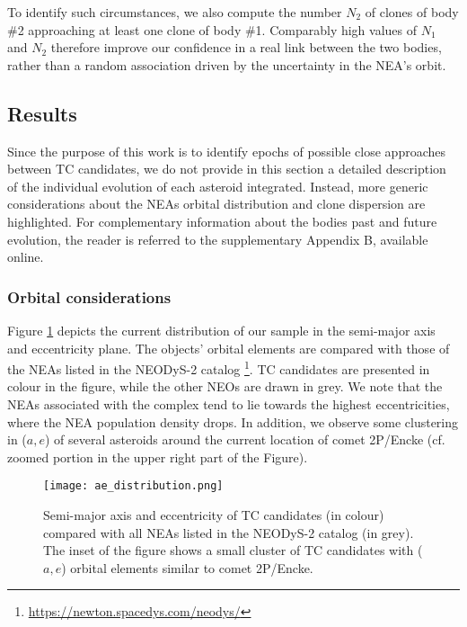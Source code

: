 \documentclass[letters,a4paper,fleqn,usenatbib]{mnras}
\begin{document}
To identify such circumstances, we also compute the number $N_2$ of clones of body \#2 approaching at least one clone of body \#1.  Comparably high values of $N_1$ and $N_2$ therefore improve our confidence in a real link between the two bodies, rather than a random association driven by the uncertainty in the NEA's orbit.

\subsection{Results}

Since the purpose of this work is to identify epochs of possible close approaches between TC candidates, we do not provide in this section a detailed description of the individual evolution of each asteroid integrated. Instead, more generic considerations about the NEAs orbital distribution and clone dispersion are highlighted. For complementary information about the bodies past and future evolution, the reader is referred to the supplementary Appendix B, available online.  

\subsubsection{Orbital considerations}

Figure \ref{fig:ae} depicts the current distribution of our sample in the semi-major axis and eccentricity plane. The objects' orbital elements are compared with those of the NEAs listed in the NEODyS-2 catalog \footnote{\url{https://newton.spacedys.com/neodys/}}. TC candidates are presented in colour in the figure, while the other NEOs are drawn in grey. We note that the NEAs associated with the complex tend to lie towards the highest eccentricities, where the NEA population density drops. In addition, we observe some clustering in ($a,e$) of several asteroids around the current location of comet 2P/Encke (cf. zoomed portion in the upper right part of the Figure). 

\begin{figure}
    \centering
    \texttt{[image: ae\_distribution.png]}
    \caption{Semi-major axis and eccentricity of TC candidates (in colour) compared with all NEAs listed in the NEODyS-2 catalog (in grey). The inset of the figure shows a small cluster of TC candidates with ($a,e$) orbital elements similar to comet 2P/Encke.}
    \label{fig:ae}
\end{figure}
\end{document}

